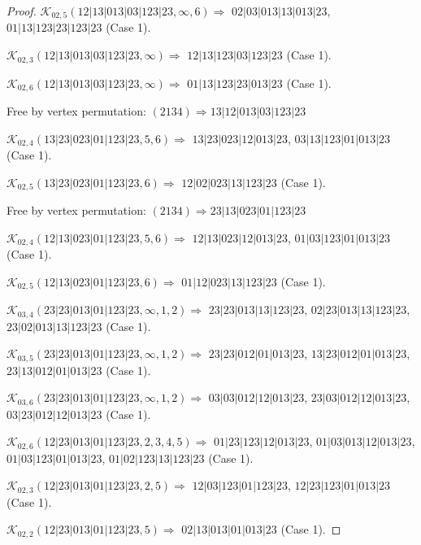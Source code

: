 \documentclass[12pt]{article}
\theoremstyle{plain}
\theoremstyle{definition}
\theoremstyle{remark}
\newcommand{\fancy}[1]{\mathcal{#1}}
\def\K{\fancy{K}}
\begin{document}
\begin{proof}
	$\K_{02,5}(12|13|013|03|123|23,\infty,6)\Rightarrow $ $02|03|013|13|013|23$, $01|13|123|23|123|23$ (Case 1).
	
	$\K_{02,3}(12|13|013|03|123|23,\infty)\Rightarrow $ $12|13|123|03|123|23$ (Case 1).
	
	$\K_{02,6}(12|13|013|03|123|23,\infty)\Rightarrow $ $01|13|123|23|013|23$ (Case 1).
	
	
	
	Free by vertex permutation: $(2 1 3 4)\Rightarrow 13|12|013|03|123|23$
	
	
	
	\bigskip
	
	$\K_{02,4}(13|23|023|01|123|23,5, 6)\Rightarrow $ $13|23|023|12|013|23$, $03|13|123|01|013|23$ (Case 1).
	
	$\K_{02,5}(13|23|023|01|123|23,6)\Rightarrow $ $12|02|023|13|123|23$ (Case 1).
	
	
	
	Free by vertex permutation: $(2 1 3 4)\Rightarrow 23|13|023|01|123|23$
	
	
	
	\bigskip
	
	$\K_{02,4}(12|13|023|01|123|23,5, 6)\Rightarrow $ $12|13|023|12|013|23$, $01|03|123|01|013|23$ (Case 1).
	
	$\K_{02,5}(12|13|023|01|123|23,6)\Rightarrow $ $01|12|023|13|123|23$ (Case 1).
	
	
	\bigskip
	
	$\K_{03,4}(23|23|013|01|123|23,\infty,1, 2)\Rightarrow $ $23|23|013|13|123|23$, $02|23|013|13|123|23$, $23|02|013|13|123|23$ (Case 1).
	
	$\K_{03,5}(23|23|013|01|123|23,\infty,1, 2)\Rightarrow $ $23|23|012|01|013|23$, $13|23|012|01|013|23$, $23|13|012|01|013|23$ (Case 1).
	
	$\K_{03,6}(23|23|013|01|123|23,\infty,1, 2)\Rightarrow $ $03|03|012|12|013|23$, $23|03|012|12|013|23$, $03|23|012|12|013|23$ (Case 1).
	
	
	\bigskip
	
	$\K_{02,6}(12|23|013|01|123|23,2, 3, 4, 5)\Rightarrow $ $01|23|123|12|013|23$, $01|03|013|12|013|23$, $01|03|123|01|013|23$, $01|02|123|13|123|23$ (Case 1).
	
	$\K_{02,3}(12|23|013|01|123|23,2, 5)\Rightarrow $ $12|03|123|01|123|23$, $12|23|123|01|013|23$ (Case 1).
	
	$\K_{02,2}(12|23|013|01|123|23,5)\Rightarrow $ $02|13|013|01|013|23$ (Case 1).
	
	
	

\end{proof}
\end{document}
